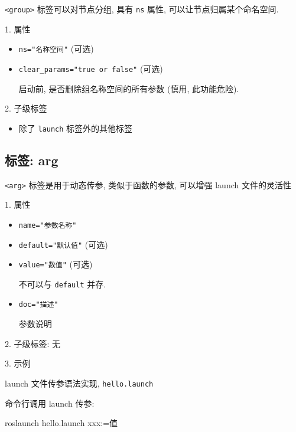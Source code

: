 \documentclass[openany, fontset=windowsold]{ctexbook}
\theoremstyle{kaiti}
\theoremstyle{normal}
\begin{document}
\verb|<group>| 标签可以对节点分组, 具有 \verb|ns| 属性, 可以让节点归属某个命名空间.

1. 属性

\begin{itemize}
  \item \verb|ns="名称空间"| (可选)

  \item \verb|clear_params="true or false"| (可选)

  启动前, 是否删除组名称空间的所有参数 (慎用, 此功能危险).
\end{itemize}

2. 子级标签

\begin{itemize}
  \item 除了 \verb|launch| 标签外的其他标签
\end{itemize}

\subsection{标签: arg}

\verb|<arg>| 标签是用于动态传参, 类似于函数的参数, 可以增强 launch 文件的灵活性

1. 属性

\begin{itemize}
  \item \verb|name="参数名称"|

  \item \verb|default="默认值"| (可选)

  \item \verb|value="数值"| (可选)

  不可以与 \verb|default| 并存.

  \item \verb|doc="描述"|

  参数说明
\end{itemize}

2. 子级标签: 无

3. 示例

launch 文件传参语法实现, \verb|hello.launch|


命令行调用 launch 传参:

\begin{bash}
  roslaunch hello.launch xxx:=值
\end{bash}
\end{document}
